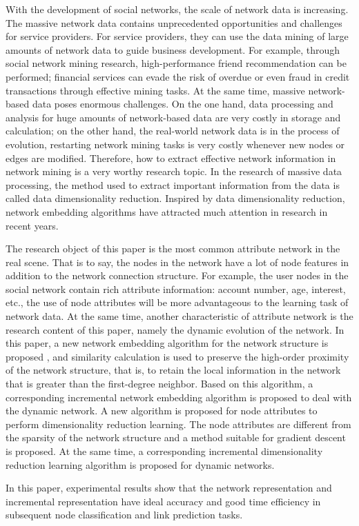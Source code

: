 With the development of social networks, the scale of network data is increasing. The massive network data contains unprecedented opportunities and challenges for service providers. For service providers, they can use the data mining of large amounts of network data to guide business development. For example, through social network mining research, high-performance friend recommendation can be performed; financial services  can evade the risk of overdue or even fraud in credit transactions  through effective mining tasks. At the same time, massive network-based data poses enormous challenges. On the one hand, data processing and analysis for huge amounts of network-based data are very costly in storage and calculation; on the other hand, the real-world network data is in the process of evolution,  restarting network mining tasks is very costly whenever new nodes or edges are modified. Therefore, how to extract effective network information in network mining is a very worthy research topic. In the research of massive data processing, the method used to extract important information from the data is called data dimensionality reduction. Inspired by data dimensionality reduction, network embedding algorithms have attracted much attention in research in recent years.

The research object of this paper is the most common attribute network in the real scene. That is to say, the nodes in the network have a lot of node features in addition to the network connection structure. For example, the user nodes in the social network contain rich attribute information: account number, age, interest,  etc., the use of node attributes will be more advantageous to the learning task of network data. At the same time, another characteristic of attribute network is the research content of this paper, namely the dynamic evolution of the network. In this paper, a new network embedding algorithm for the network structure is proposed , and similarity calculation is used to preserve the high-order proximity of the network structure, that is, to retain the local information in the network that is greater than the first-degree neighbor. Based on this algorithm, a corresponding incremental network embedding algorithm is proposed to deal with the dynamic network. A new algorithm is proposed for node attributes to perform dimensionality reduction learning. The node attributes are different from the sparsity of the network structure and a method suitable for gradient descent is proposed.  At the same time, a corresponding incremental dimensionality reduction learning algorithm is proposed for dynamic networks.

In this paper, experimental results show that the network representation and incremental representation have ideal accuracy and good time efficiency in subsequent node classification and link prediction tasks.

